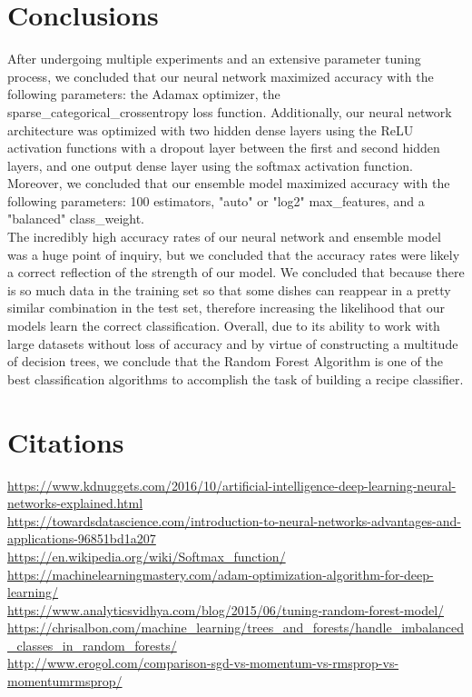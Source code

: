 \documentclass[11pt]{article}
\begin{document}
\section{Conclusions}

After undergoing multiple experiments and an extensive parameter tuning process,
we concluded that our neural network maximized accuracy with the following parameters:
the Adamax optimizer, the sparse\_categorical\_crossentropy loss function. Additionally,
our neural network architecture was optimized with two hidden dense layers using
the ReLU activation functions with a dropout layer between the first and second
hidden layers, and one output dense layer using the softmax activation function.
Moreover, we concluded that our ensemble model maximized accuracy with the
following parameters: 100 estimators, "auto" or "log2" max\_features, and a
"balanced" class\_weight. \\

The incredibly high accuracy rates of our neural network and ensemble model was
a huge point of inquiry, but we concluded that the accuracy rates were likely
a correct reflection of the strength of our model. We concluded that because
there is so much data in the training set so that some dishes can reappear in
a pretty similar combination in the test set, therefore increasing the likelihood
that our models learn the correct classification. Overall, due to its ability to
work with large datasets without loss of accuracy and by virtue of constructing
a multitude of decision trees, we conclude that the Random Forest Algorithm is
one of the best classification algorithms to accomplish the task of building a
recipe classifier.\\

\section{Citations}
\url{https://www.kdnuggets.com/2016/10/artificial-intelligence-deep-learning-neural-networks-explained.html} \\
\url{https://towardsdatascience.com/introduction-to-neural-networks-advantages-and-applications-96851bd1a207} \\
\url{https://en.wikipedia.org/wiki/Softmax_function/} \\
\url{https://machinelearningmastery.com/adam-optimization-algorithm-for-deep-learning/} \\
\url{https://www.analyticsvidhya.com/blog/2015/06/tuning-random-forest-model/} \\
\url{https://chrisalbon.com/machine_learning/trees_and_forests/handle_imbalanced_classes_in_random_forests/} \\
\url{http://www.erogol.com/comparison-sgd-vs-momentum-vs-rmsprop-vs-momentumrmsprop/} \\
\end{document}
